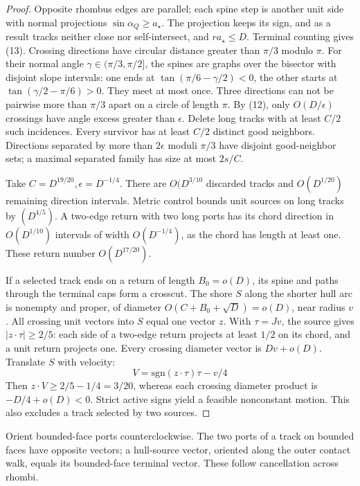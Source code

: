 \documentclass[10pt,reqno]{amsart}
\begin{document}
\begin{proof}
    Opposite rhombus edges are parallel; each spine step is another unit side with normal projections $\sin \alpha_Q \ge a_\star$. The projection keeps its sign, and as a result tracks neither close nor self-intersect, and $r a_\star \le D$. Terminal counting gives (13). Crossing directions have circular distance greater than $\pi / 3$ modulo $\pi$. For their normal angle $\gamma \in (\pi / 3, \pi / 2]$, the spines are graphs over the bisector with disjoint slope intervals: one ends at $\tan(\pi/6  - \gamma/2) < 0$, the other starts at $\tan(\gamma/2 - \pi/6) > 0$. They meet at most once. Three directions can not be pairwise more than $\pi / 3$ apart on a circle of length $\pi$. By (12), only $O(D / \epsilon)$ crossings have angle excess greater than $\epsilon$. Delete long tracks with at least $C / 2$ such incidences. Every survivor has at least $C / 2$ distinct good neighbors. Directions separated by more than $2 \epsilon$ moduli $\pi / 3$ have disjoint good-neighbor sets; a maximal separated family has size at most $2s / C$.

    Take $C = D^{19/20}, \epsilon = D^{-1/4}$. There are $O(D^{3/10}$ discarded tracks and $O(D^{1/20})$ remaining direction intervals. Metric control bounds unit sources on long tracks by $(D^{4/5})$. A two-edge return with two long ports has its chord direction in $O(D^{1/10})$ intervals of width $O(D^{-1/4})$, as the chord has length at least one. These return number $O(D^{17/20})$.

    If a selected track ends on a return of length $B_0 = o(D)$, its spine and paths through the terminal caps form a crosscut. The shore $S$ along the shorter hull arc is nonempty and proper, of diameter $O(C + B_0 + \sqrt{D}) = o(D)$, near radius $v$. All crossing unit vectors into $S$ equal one vector $z$. With $\tau = Jv$, the source gives $|z \cdot \tau| \ge 2 / 5$: each side of a two-edge return projects at least $1/2$ on its chord, and a unit return projects one. Every crossing diameter vector is $Dv + o(D)$. Translate $S$ with velocity:
    \begin{equation}
        V = \text{sgn}(z \cdot \tau) \tau - v / 4
    \end{equation}
    Then $z \cdot V \ge 2/5 - 1/4 = 3/20$, whereas each crossing diameter product is $-D / 4 + o(D) < 0$. Strict active signs yield a feasible nonconstant motion. This also excludes a track selected by two sources.
\end{proof}

Orient bounded-face ports counterclockwise. The two ports of a track on bounded faces have opposite vectors; a hull-source vector, oriented along the outer contact walk, equals its bounded-face terminal vector. These follow cancellation across rhombi.
\end{document}
